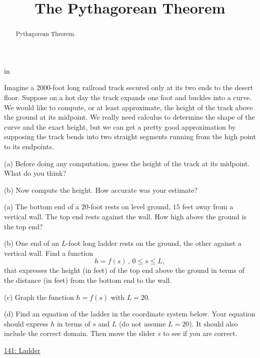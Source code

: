 \documentclass{ximera}
\title{The Pythagorean Theorem}
\newcommand{\pskip}{\vskip 0.1 in}
\begin{document}
\begin{abstract}
Pythagorean Theorem.
\end{abstract}
\maketitle


\pskip


\begin{question}  \label{Q324dfg45rhp}
Imagine a 2000-foot long railroad track secured only at its two ends to the desert floor. Suppose on a hot day the track expands one foot and buckles into a curve. We would like to compute, or at least approximate, the height of the track above the ground at its midpoint. We really need calculus to determine the shape of the curve and the exact height, but we can get a pretty good approximation by supposing the track bends into two straight segments running from the high point to its endpoints.


\begin{freeResponse}
(a) Before doing any computation, guess the height of the track at its midpoint. What do you think?
\end{freeResponse}

(b) Now compute the height. How accurate was your estimate?
\end{question}

\begin{question}  \label{Qdfdst4nb554334}
(a) The bottom end of a $20$-foot rests on level ground, $15$ feet away from a vertical wall. The top end rests against the wall. How high above the ground is the top end?

(b) One end of an $L$-foot long ladder rests on the ground, the other against a vertical wall. Find a function 
\[
  h = f(s) \, , \, 0\leq s \leq L,
\]
that expresses the height (in feet) of the top end above the ground in terms of the distance (in feet) from the bottom end to the wall.

(c)  Graph the function $h = f(s)$ with $L=20$.

(d) Find an equation of the ladder in the coordinate system below. Your equation should express $h$ in terms of $s$ and $L$ (do not assume $L=20$). It should also include the correct domain. Then move the slider $s$ to see if you are correct.

\begin{exploration}

\begin{onlineOnly}
    \begin{center}
\end{center}
\end{onlineOnly}

\href{https://www.desmos.com/calculator/9dmlpjfvfl}{141: Ladder}

\end{exploration}

\end{question}
\end{document}
